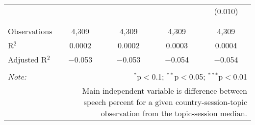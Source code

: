 \begin{table}[!htbp]
\begin{tabular}{@{\extracolsep{5pt}}lcccc}
  &  &  &  & (0.010) \\ 
  & & & & \\ 
\hline \\[-1.8ex] 
Observations & 4,309 & 4,309 & 4,309 & 4,309 \\ 
R$^{2}$ & 0.0002 & 0.0002 & 0.0003 & 0.0004 \\ 
Adjusted R$^{2}$ & $-$0.053 & $-$0.053 & $-$0.054 & $-$0.054 \\ 
\hline 
\hline \\[-1.8ex] 
\textit{Note:}  & \multicolumn{4}{r}{$^{*}$p$<$0.1; $^{**}$p$<$0.05; $^{***}$p$<$0.01} \\ 
 & \multicolumn{4}{r}{Main independent variable is difference between speech percent for a given country-session-topic observation from the topic-session median.} \\ 
\end{tabular} 
\end{table} 

